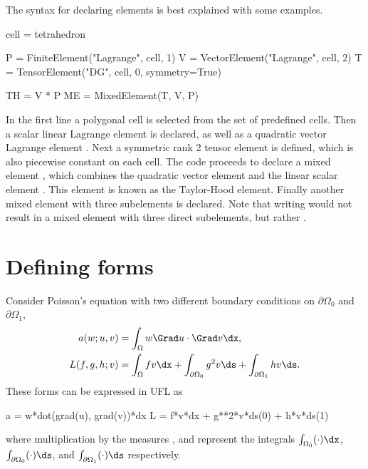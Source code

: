The syntax for declaring elements is best explained with some
examples.
\begin{uflcode}
cell = tetrahedron

P = FiniteElement("Lagrange", cell, 1)
V = VectorElement("Lagrange", cell, 2)
T = TensorElement("DG", cell, 0, symmetry=True)

TH = V * P
ME = MixedElement(T, V, P)
\end{uflcode}
In the first line a polygonal cell is selected from the set of
predefined cells.  Then a scalar linear Lagrange element  is
declared, as well as a quadratic vector Lagrange element .
Next a symmetric rank 2 tensor element  is defined, which is
also piecewise constant on each cell. The code proceeds to declare a
mixed element , which combines the quadratic vector element
 and the linear scalar element . This element is known
as the Taylor-Hood element.  Finally another mixed element with three
subelements is declared. Note that writing  would not
result in a mixed element with three direct subelements, but rather
.

\section{Defining forms}
\label{ufl:sec:forms}

Consider Poisson's equation with two different boundary
conditions on $\partial\Omega_0$ and $\partial\Omega_1$,
\begin{align}
a(w; u, v) &= \int_\Omega w \Grad u \cdot \Grad v \dx, \\
L(f, g, h; v) &= \int_\Omega f v \dx + \int_{\partial\Omega_0} g^2 v \ds + \int_{\partial\Omega_1} h v \ds.
\end{align}
These forms can be expressed in UFL as
\begin{uflcode}
a = w*dot(grad(u), grad(v))*dx
L = f*v*dx + g**2*v*ds(0) + h*v*ds(1)
\end{uflcode}
where multiplication by the measures ,  and 
represent the integrals $\int_{\Omega_0} (\cdot) \dx$,
$\int_{\partial\Omega_0} (\cdot) \ds$,
and $\int_{\partial\Omega_1} (\cdot) \ds$
respectively.

